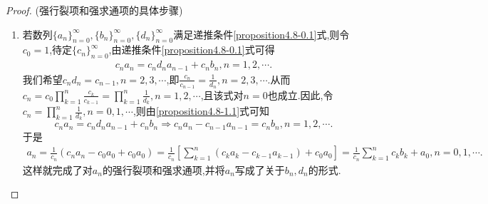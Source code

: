 \documentclass[../../main.tex]{subfiles}%
\begin{document}
\begin{proof}

(强行裂项和强求通项的具体步骤)
\begin{enumerate}[(1)]
\item 若数列\(\{ a_n \}_{n = 0}^{\infty}, \{ b_n \}_{n = 0}^{\infty}, \{ d_n \}_{n = 0}^{\infty}\)满足递推条件\eqref{proposition4.8-0.1}式,则令\(c_0 = 1\),待定\(\{ c_n \}_{n = 0}^{\infty}\),由递推条件\eqref{proposition4.8-0.1}式可得
\begin{align}\label{proposition4.8-1.1}
c_na_n = c_nd_na_{n - 1} + c_nb_n, n = 1, 2, \cdots. 
\end{align}
我们希望\(c_nd_n = c_{n - 1}, n = 2, 3, \cdots\),即\(\frac{c_n}{c_{n - 1}} = \frac{1}{d_n}, n = 2, 3, \cdots\).从而\(c_n = c_0\prod_{k = 1}^n{\frac{c_k}{c_{k - 1}}} = \prod_{k = 1}^n{\frac{1}{d_k}}, n = 1, 2, \cdots\),且该式对\(n = 0\)也成立.因此,令\(c_n = \prod_{k = 1}^n{\frac{1}{d_k}}, n = 0, 1, \cdots\),则由\eqref{proposition4.8-1.1}式可知
\[
c_na_n = c_nd_na_{n - 1} + c_nb_n \Rightarrow c_na_n - c_{n - 1}a_{n - 1} = c_nb_n, n = 1, 2, \cdots.
\]
于是
\begin{align*}
a_n = \frac{1}{c_n}(c_na_n - c_0a_0 + c_0a_0)
= \frac{1}{c_n}\left[ \sum_{k = 1}^n{(c_ka_k - c_{k - 1}a_{k - 1})} + c_0a_0 \right]
= \frac{1}{c_n}\sum_{k = 1}^n{c_kb_k} + a_0, n = 0, 1, \cdots.
\end{align*}
这样就完成了对\(a_n\)的强行裂项和强求通项,并将\(a_n\)写成了关于\(b_n, d_n\)的形式.


\end{enumerate}
\end{proof}
\end{document}
